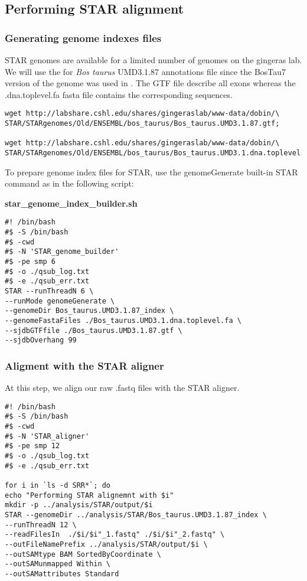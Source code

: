  

\subsection{Performing STAR alignment}

\subsubsection{Generating genome indexes files}

STAR genomes are available for a limited number of genomes on the gingeras lab. We will use the for \textit{Bos taurus}  UMD3.1.87 annotations file since the BosTau7 version of the genome was used in \cite{Ariel2021}. The GTF file describe all exons whereas the .dna.toplevel.fa fasta file contains the corresponding sequences.



\begin{verbatim}
wget http://labshare.cshl.edu/shares/gingeraslab/www-data/dobin/\
STAR/STARgenomes/Old/ENSEMBL/bos_taurus/Bos_taurus.UMD3.1.87.gtf;

wget http://labshare.cshl.edu/shares/gingeraslab/www-data/dobin/\
STAR/STARgenomes/Old/ENSEMBL/bos_taurus/Bos_taurus.UMD3.1.dna.toplevel.fa;
\end{verbatim}

To prepare genome index files for STAR, use the genomeGenerate built-in STAR command as in the following script:


\textbf{star\_genome\_index\_builder.sh}
\begin{verbatim}
#! /bin/bash
#$ -S /bin/bash
#$ -cwd
#$ -N 'STAR_genome_builder'
#$ -pe smp 6
#$ -o ./qsub_log.txt
#$ -e ./qsub_err.txt
STAR --runThreadN 6 \
--runMode genomeGenerate \
--genomeDir Bos_taurus.UMD3.1.87_index \
--genomeFastaFiles ./Bos_taurus.UMD3.1.dna.toplevel.fa \
--sjdbGTFfile ./Bos_taurus.UMD3.1.87.gtf \
--sjdbOverhang 99
\end{verbatim}






\subsubsection{Aligment with the STAR aligner}

At this step, we align our raw .fastq files with the STAR aligner.

\begin{verbatim}
#! /bin/bash
#$ -S /bin/bash
#$ -cwd
#$ -N 'STAR_aligner'
#$ -pe smp 12
#$ -o ./qsub_log.txt
#$ -e ./qsub_err.txt

for i in `ls -d SRR*`; do
echo "Performing STAR alignemnt with $i"
mkdir -p ../analysis/STAR/output/$i
STAR --genomeDir ../analysis/STAR/Bos_taurus.UMD3.1.87_index \
--runThreadN 12 \
--readFilesIn  ./$i/$i"_1.fastq" ./$i/$i"_2.fastq" \
--outFileNamePrefix ../analysis/STAR/output/$i \
--outSAMtype BAM SortedByCoordinate \
--outSAMunmapped Within \
--outSAMattributes Standard
\end{verbatim}



